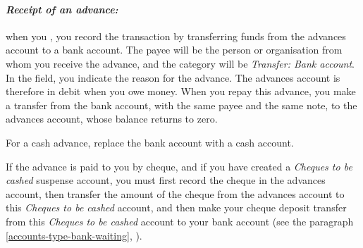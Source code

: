 \paragraph{\textsl{Receipt of an advance:}} when you , you record the transaction by transferring funds from the advances account to a bank account. The payee will be the person or organisation from whom you receive the advance, and the category will be \emph{Transfer: Bank account}. In the  field, you indicate the reason for the advance. The advances account is therefore in debit when you owe money. When you repay this advance, you make a transfer from the bank account, with the same payee and the same note, to the advances account, whose balance returns to zero.

For a cash advance, replace the bank account with a cash account.

If the advance is paid to you by cheque, and if you have created a \emph{Cheques to be cashed} suspense account, you must first record the cheque in the advances account, then transfer the amount of the cheque from the advances account to this \emph{Cheques to be cashed} account, and then make your cheque deposit transfer from this \emph{Cheques to be cashed} account to your bank account (see the paragraph \vref{accounts-type-bank-waiting}, ).

